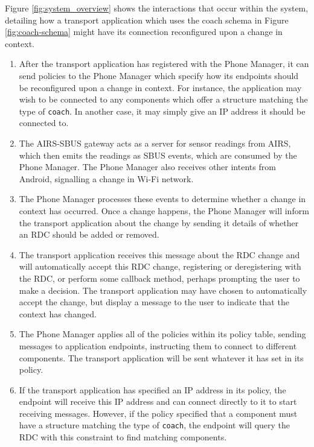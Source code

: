 \documentclass[12pt,twoside,notitlepage]{report}
\begin{document}
Figure \ref{fig:system_overview} shows the interactions that occur within the system, detailing how a transport application which uses the coach schema in Figure \ref{fig:coach-schema} might have its connection reconfigured upon a change in context.

\begin{enumerate}

\item After the transport application has registered with the Phone Manager, it can send policies to the Phone Manager which specify how its endpoints should be reconfigured upon a change in context. For instance, the application may wish to be connected to any components which offer a structure matching the type of {\tt coach}. In another case, it may simply give an IP address it should be connected to.

\item The AIRS-SBUS gateway acts as a server for sensor readings from AIRS, which then emits the readings as SBUS events, which are consumed by the Phone Manager. The Phone Manager also receives other intents from Android, signalling a change in Wi-Fi network.

\item The Phone Manager processes these events to determine whether a change in context has occurred. Once a change happens, the Phone Manager will inform the transport application about the change by sending it details of whether an RDC should be added or removed. 

\item The transport application receives this message about the RDC change and will automatically accept this RDC change, registering or deregistering with the RDC, or perform some callback method, perhaps prompting the user to make a decision. The transport application may have chosen to automatically accept the change, but display a message to the user to indicate that the context has changed.

\item The Phone Manager applies all of the policies within its policy table, sending messages to application endpoints, instructing them to connect to different components. The transport application will be sent whatever it has set in its policy.

\item If the transport application has specified an IP address in its policy, the endpoint will receive this IP address and can connect directly to it to start receiving messages. However, if the policy specified that a component must have a structure matching the type of {\tt coach}, the endpoint will query the RDC with this constraint to find matching components.


\end{enumerate}
\end{document}
